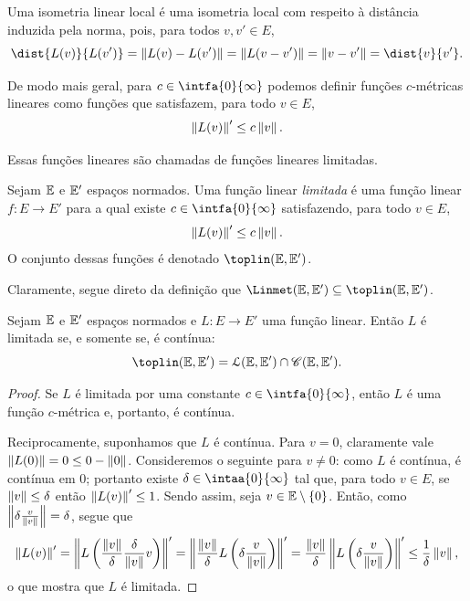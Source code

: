Uma isometria linear local é uma isometria local com respeito à distância induzida pela norma, pois, para todos $v,v' \in E$,
	\begin{equation*}
	\dist{L(v)}{L(v')} = \nor{L(v) - L(v')} = \nor{L(v - v')} = \nor{v - v'} = \dist{v}{v'}.
	\end{equation*}

De modo mais geral, para $c \in \intfa{0}{\infty}$ podemos definir funções $c$-métricas lineares como funções que satisfazem, para todo $v \in E$,
	\begin{equation*}
	\left\Vert{L(v)}\right\Vert' \leq c \left\Vert{v}\right\Vert.
	\end{equation*}

Essas funções lineares são chamadas de funções lineares limitadas.

\begin{defi}
Sejam $\mathbb{E}$ e $\mathbb{E}'$ espaços normados. Uma função linear \emph{limitada} é uma função linear $f\colon E \to E'$ para a qual existe $c \in \intfa{0}{\infty}$ satisfazendo, para todo $v \in E$,
	\begin{equation*}
	\left\Vert{L(v)}\right\Vert' \leq c \left\Vert{v}\right\Vert.
	\end{equation*}
O conjunto dessas funções é denotado $\toplin(\E,\E')$.
\end{defi}

Claramente, segue direto da definição que $\Linmet(\E,\E') \subseteq \toplin(\E,\E')$.

\begin{prop}
Sejam $\mathbb{E}$ e $\mathbb{E}'$ espaços normados e $L\colon E \to E'$ uma função linear. Então $L$ é limitada se, e somente se, é contínua:
	\begin{equation*}
	\toplin(\E,\E') = \lin(\E,\E') \cap \cont(\E,\E').
	\end{equation*}
\end{prop}
\begin{proof}
Se $L$ é limitada por uma constante $c \in \intfa{0}{\infty}$, então $L$ é uma função $c$-métrica e, portanto, é contínua.

Reciprocamente, suponhamos que $L$ é contínua. Para $v=0$, claramente vale $\left\Vert{L(0)}\right\Vert = 0 \leq 0 - \left\Vert{0}\right\Vert$. Consideremos o seguinte para $v \neq 0$: como $L$ é contínua, é contínua em $0$; portanto existe $\delta \in \intaa{0}{\infty}$ tal que, para todo $v \in E$, se $\left\Vert{v}\right\Vert \leq \delta$ então $\left\Vert{L(v)}\right\Vert' \leq 1$. Sendo assim, seja $v \in \mathbb{E} \setminus \{0\}$. Então, como $\left\Vert{\delta\frac{v}{\left\Vert{v}\right\Vert}}\right\Vert=\delta$, segue que
	\begin{equation*}
	\left\Vert{L(v)}\right\Vert' = \left\Vert{L\left(\frac{\left\Vert{v}\right\Vert}{\delta}\frac{\delta}{\left\Vert{v}\right\Vert}v\right)}\right\Vert' = \left\Vert{\frac{\left\Vert{v}\right\Vert}{\delta}L\left(\delta\frac{v}{\left\Vert{v}\right\Vert}\right)}\right\Vert' = \frac{\left\Vert{v}\right\Vert}{\delta}\left\Vert{L\left(\delta\frac{v}{\left\Vert{v}\right\Vert}\right)}\right\Vert' \leq \frac{1}{\delta}\left\Vert{v}\right\Vert,
	\end{equation*}
o que mostra que $L$ é limitada.
\end{proof}

